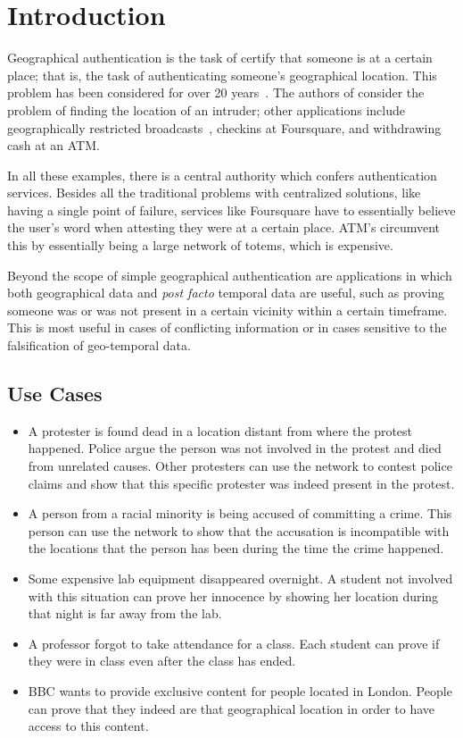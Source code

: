 \section{Introduction}

Geographical authentication
is the task of certify that someone is at a certain place;
that is,
the task of authenticating someone's geographical location.
This problem has been considered for over 20 years~\cite{denning_1996}.
The authors of \cite{denning_1996} consider the problem of finding
the location of an intruder;
other applications include geographically restricted broadcasts~\cite{gdpr},
checkins at Foursquare,
and withdrawing cash at an ATM.

In all these examples,
there is a central authority which confers authentication services.
Besides all the traditional problems with centralized solutions,
like having a single point of failure,
services like Foursquare have to essentially believe the user's word
when attesting they were at a certain place.
ATM's circumvent this by essentially being a large network of totems,
which is expensive.

Beyond the scope of simple geographical authentication
are applications in which both geographical data and \textit{post facto}
temporal data are useful, such as
proving someone was or was not present in a certain vicinity within a
certain timeframe.
This is most useful in cases of conflicting information or in cases sensitive to
the falsification of geo-temporal data.


\subsection{Use Cases}

\begin{itemize}
	\item A protester is found dead in a location distant from where the protest happened.
		Police argue the person was not involved in the protest
		and died from unrelated causes.
		Other protesters can use the network to contest police claims
		and show that this specific protester was indeed present in the protest.

	\item A person from a racial minority is being accused of committing a crime.
		This person can use the network to show that the accusation
		is incompatible with the locations that the person has been
		during the time the crime happened.

	\item Some expensive lab equipment disappeared overnight.
		A student not involved with this situation
		can prove her innocence by showing her location during that night
		is far away from the lab.

	\item A professor forgot to take attendance for a class.
		Each student can prove if they were in class
		even after the class has ended.

	\item BBC wants to provide exclusive content for people located in London.
		People can prove that they indeed are that geographical location
		in order to have access to this content.
\end{itemize}

